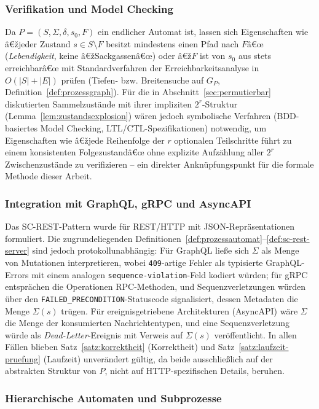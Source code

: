 ﻿\documentclass[a4paper,12pt]{article}
\theoremstyle{definition}
\begin{document}
\subsubsection{Verifikation und Model Checking}

Da $P=(S,\Sigma,\delta,s_0,F)$ ein endlicher Automat ist, lassen sich Eigenschaften wie
â€žjeder Zustand $s\in S\setminus F$ besitzt mindestens einen Pfad nach $F$â€œ
(\emph{Lebendigkeit}, keine â€žSackgassenâ€œ) oder â€ž$F$ ist von $s_0$ aus stets erreichbarâ€œ
mit Standardverfahren der Erreichbarkeitsanalyse in $O(|S|+|E|)$ prüfen (Tiefen- bzw.
Breitensuche auf $G_P$, Definition~\ref{def:prozessgraph}). Für die in
Abschnitt~\ref{sec:permutierbar} diskutierten Sammelzustände mit ihrer impliziten
$2^r$-Struktur (Lemma~\ref{lem:zustandsexplosion}) wären jedoch symbolische Verfahren
(BDD-basiertes Model Checking, LTL/CTL-Spezifikationen) notwendig, um Eigenschaften wie
â€žjede Reihenfolge der $r$ optionalen Teilschritte führt zu einem konsistenten
Folgezustandâ€œ ohne explizite Aufzählung aller $2^r$ Zwischenzustände zu verifizieren --
ein direkter Anknüpfungspunkt für die formale Methode dieser Arbeit.

\subsubsection{Integration mit GraphQL, gRPC und AsyncAPI}

Das SC-REST-Pattern wurde für REST/HTTP mit JSON-Repräsentationen formuliert. Die
zugrundeliegenden Definitionen~\ref{def:prozessautomat}--\ref{def:sc-rest-server} sind
jedoch protokollunabhängig: Für GraphQL ließe sich $\Sigma$ als Menge von Mutationen
interpretieren, wobei \texttt{409}-artige Fehler als typisierte GraphQL-Errors mit einem
analogen \texttt{sequence-violation}-Feld kodiert würden; für gRPC entsprächen die
Operationen RPC-Methoden, und Sequenzverletzungen würden über den
\texttt{FAILED\_PRECONDITION}-Statuscode signalisiert, dessen Metadaten die Menge
$\Sigma(s)$ trügen. Für ereignisgetriebene Architekturen (AsyncAPI) wäre $\Sigma$ die
Menge der konsumierten Nachrichtentypen, und eine Sequenzverletzung würde als
\emph{Dead-Letter}-Ereignis mit Verweis auf $\Sigma(s)$ veröffentlicht. In allen Fällen
blieben Satz~\ref{satz:korrektheit} (Korrektheit) und Satz~\ref{satz:laufzeit-pruefung}
(Laufzeit) unverändert gültig, da beide ausschließlich auf der abstrakten Struktur von
$P$, nicht auf HTTP-spezifischen Details, beruhen.

\subsubsection{Hierarchische Automaten und Subprozesse}
\end{document}
